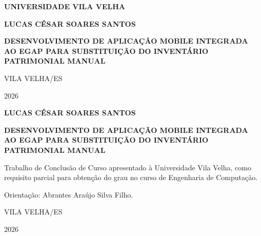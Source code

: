 \documentclass[12pt,a4paper]{article}
\newcommand{\autor}{Lucas César Soares Santos}
\newcommand{\instituicao}{Universidade Vila Velha}
\newcommand{\localdefesa}{Vila Velha/ES}
\newcommand{\anodefesa}{2026}
\newcommand{\curso}{Engenharia de Computação}
\newcommand{\orientador}{Abrantes Araújo Silva Filho}
\newcommand{\titulotrabalho}{Desenvolvimento de Aplicação Mobile Integrada ao EGAP para Substituição do Inventário Patrimonial Manual}
\begin{document}
\hypersetup{pageanchor=false}

\begin{titlepage}
    \centering
    {\large\textbf{\MakeUppercase{\instituicao}}\par}
    \vspace{2.5cm}
    {\large\textbf{\MakeUppercase{\autor}}\par}
    \vspace{3.2cm}
    {\Large\bfseries\MakeUppercase{\titulotrabalho}\par}
    \vfill
    {\large\MakeUppercase{\localdefesa}\par}
    {\large\anodefesa\par}
\end{titlepage}

\begin{titlepage}
    \centering
    {\large\textbf{\MakeUppercase{\autor}}\par}
    \vspace{3cm}
    {\Large\bfseries\MakeUppercase{\titulotrabalho}\par}
    \vspace{3cm}
    \hfill
    \begin{minipage}{0.52\textwidth}
        Trabalho de Conclusão de Curso apresentado à \instituicao, como requisito parcial para obtenção do grau no curso de \curso.

        \vspace{0.5cm}
        Orientação: \orientador.
    \end{minipage}
    \vfill
    {\large\MakeUppercase{\localdefesa}\par}
    {\large\anodefesa\par}
\end{titlepage}
\end{document}
